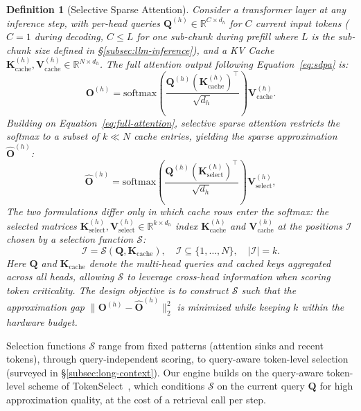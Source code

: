 \documentclass[10pt,conference]{IEEEtran}
\newtheorem{definition}{Definition}
\begin{document}
\begin{definition}[Selective Sparse Attention]
\label{def:ssa}
Consider a transformer layer at any inference step, with per-head 
queries $\mathbf{Q}^{(h)} \in \mathbb{R}^{C \times d_h}$ for $C$ current 
input tokens ($C = 1$ during decoding, $C \leq L$ for one sub-chunk during prefill where $L$ is the sub-chunk size defined in §\ref{subsec:llm-inference}), 
and a KV Cache 
$\mathbf{K}^{(h)}_{\text{cache}}, \mathbf{V}^{(h)}_{\text{cache}} \in \mathbb{R}^{N \times d_h}$. 
The full attention output following Equation~\eqref{eq:sdpa} is:
\begin{equation}
    \mathbf{O}^{(h)} = \text{softmax}\!\left(\frac{\mathbf{Q}^{(h)} (\mathbf{K}^{(h)}_{\text{cache}})^\top}{\sqrt{d_h}}\right) \mathbf{V}^{(h)}_{\text{cache}}.
    \label{eq:full-attention}
\end{equation}
Building on Equation~\eqref{eq:full-attention}, selective sparse attention
restricts the softmax to a subset of $k \ll N$ cache entries, yielding the
sparse approximation $\hat{\mathbf{O}}^{(h)}$:
\begin{equation}
    \hat{\mathbf{O}}^{(h)} = \text{softmax}\!\left(\frac{\mathbf{Q}^{(h)} (\mathbf{K}^{(h)}_{\text{select}})^\top}{\sqrt{d_h}}\right) \mathbf{V}^{(h)}_{\text{select}},
    \label{eq:sparse-attention}
\end{equation}
The two formulations differ only in \emph{which} cache rows enter the
softmax: the selected matrices
$\mathbf{K}^{(h)}_{\text{select}}, \mathbf{V}^{(h)}_{\text{select}} \in \mathbb{R}^{k \times d_h}$
index $\mathbf{K}^{(h)}_{\text{cache}}$ and
$\mathbf{V}^{(h)}_{\text{cache}}$ at the positions $\mathcal{I}$ chosen by
a \textit{selection function} $\mathcal{S}$:
\begin{equation}
    \mathcal{I} = \mathcal{S}\!\left(\mathbf{Q}, \mathbf{K}_{\text{cache}}\right), \quad \mathcal{I} \subseteq \{1, \ldots, N\}, \quad |\mathcal{I}| = k.
    \label{eq:selection}
\end{equation}
Here $\mathbf{Q}$ and $\mathbf{K}_{\text{cache}}$ denote the multi-head 
queries and cached keys aggregated across all heads, allowing $\mathcal{S}$ 
to leverage cross-head information when scoring token criticality. The 
design objective is to construct $\mathcal{S}$ such that the approximation 
gap $\big\|\mathbf{O}^{(h)} - \hat{\mathbf{O}}^{(h)}\big\|_2^2$ is 
minimized while keeping $k$ within the hardware budget.
\end{definition}

Selection functions $\mathcal{S}$ range from fixed patterns (attention
sinks and recent tokens), through query-independent scoring, to query-aware
token-level selection (surveyed in §\ref{subsec:long-context}). Our engine
builds on the query-aware token-level scheme of
TokenSelect~\cite{tokenselect2025}, which conditions $\mathcal{S}$ on the
current query $\mathbf{Q}$ for high approximation quality, at the cost of a
retrieval call per step.
\end{document}
